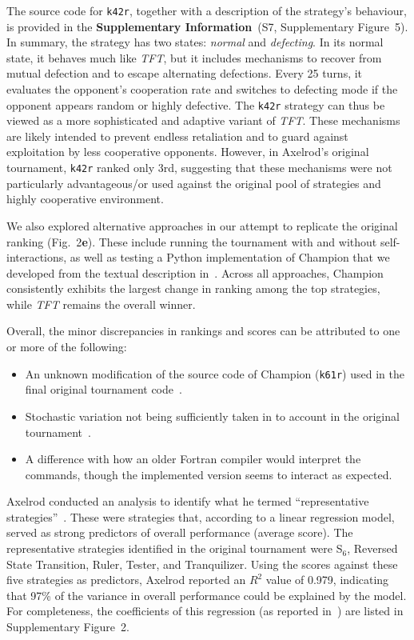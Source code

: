 \documentclass{article}
\newcommand{\TFT}{\emph{TFT}}
\newcommand{\SI}{\textbf{Supplementary Information}}
\begin{document}
The source code for \texttt{k42r}, together with a description of the strategy's
behaviour, is provided in the \SI~(S7, Supplementary Figure~5). In summary, the strategy has two states:
\emph{normal} and \emph{defecting}. In its normal state, it behaves much like
\TFT{}, but it includes mechanisms to recover from mutual defection and to
escape alternating defections. Every 25 turns, it evaluates the opponent's
cooperation rate and switches to defecting mode if the opponent appears random
or highly defective. The \texttt{k42r} strategy can thus be viewed as a more
sophisticated and adaptive variant of \TFT{}. These mechanisms are likely
intended to prevent endless retaliation and to guard against exploitation by
less cooperative opponents. However, in Axelrod's original tournament,
\texttt{k42r} ranked only 3rd, suggesting that these mechanisms were not
particularly advantageous/or used against the original pool of strategies
and highly cooperative environment.

We also explored alternative approaches in our attempt to replicate the
original ranking (Fig.~2\textbf{e}). These include running
the tournament with and without self-interactions, as well as testing a Python
implementation of Champion that we developed from the textual
description in~\cite{Axelrod1980b}. Across all approaches, Champion
consistently exhibits the largest change in ranking among the top strategies,
while \TFT{} remains the overall winner.

Overall, the minor discrepancies in rankings and scores can be attributed to one
or more of the following:

\begin{itemize}
\item An unknown modification of the source code of Champion (\texttt{k61r})
used in the final original tournament code~\cite{Axelrod1980b}.
\item Stochastic variation not being sufficiently taken in to account in the
original tournament~\cite{Axelrod1980b}.
\item A difference with how an older Fortran compiler would interpret the
commands, though the implemented version seems to
interact as expected.
\end{itemize}

Axelrod conducted an analysis to identify what he termed ``representative
strategies''~\cite{Axelrod1980b}. These were strategies that, according to a
linear regression model, served as strong predictors of overall performance
(average score). The representative strategies identified in the original
tournament were S$_6$, Reversed State Transition, Ruler, Tester, and Tranquilizer.
Using the scores against these five strategies as predictors, Axelrod reported
an \(R^2\) value of 0.979,
indicating that 97\% of the variance in overall
performance could be explained by the model. For completeness, the coefficients
of this regression (as reported in~\cite{Axelrod1980b}) are listed in
Supplementary Figure~2.
\end{document}
